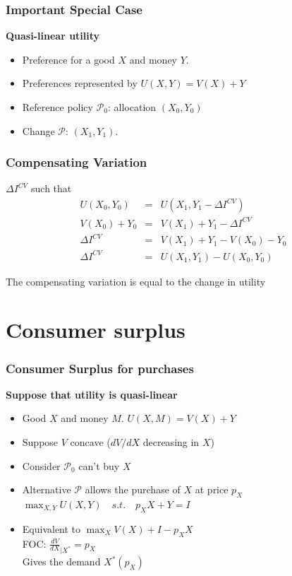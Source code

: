 \documentclass[handout]{beamer}
\newcommand{\mcl}{\mathcal}
\newcommand{\mdp}{\medskip \pause}
\begin{document}
\begin{frame} \frametitle{Important Special Case}
\textbf{Quasi-linear utility} \begin{itemize} \item Preference for a good $X$ and money $Y$.
\item Preferences represented by
 $U(X,Y) = V(X) + Y$
\item Reference policy $\mcl P_0$: allocation $(X_0, Y_0)$
\item Change $\mcl P$: $(X_1, Y_1)$. \end{itemize} \mdp

\end{frame}

\begin{frame} \frametitle{Compensating Variation}

$\Delta I^{CV}$ such that
\begin{eqnarray*}
U(X_0,Y_0) &=& U(X_1, Y_1- \Delta I^{CV}) \\
V(X_0) + Y_0 &=& V(X_1) + Y_1 - \Delta I^{CV} \\
\Delta I^{CV} &=& V(X_1) + Y_1 - V(X_0) - Y_0 \\
\Delta I^{CV} &=& U(X_1,Y_1) - U(X_0,Y_0)
\end{eqnarray*}

The compensating variation is equal to the change in utility 
 \end{frame}

\section{Consumer surplus}

\begin{frame} \frametitle{Consumer Surplus for purchases}

\textbf{Suppose that utility is quasi-linear} \begin{itemize} \item Good $X$
and money $M$. $U(X,M) = V(X) + Y$ \item Suppose $V$ concave ($dV/dX$
decreasing in $X$) 
\item Consider   $\mcl P_0$ can't buy $X$  
\item Alternative $\mcl P$ allows the purchase of $X$ at price $p_X$ \\\mdp
$\max_{X,Y} U(X,Y) \quad s.t. \quad p_X X + Y = I$

\item Equivalent to $\max_{X} V(X) + I - p_X X$
\\ FOC: $ \frac{dV}{dX}_{|X^*} =  p_X$\\ Gives the demand $X^*(p_X)$ \end{itemize}\mdp

\end{frame}
\end{document}
